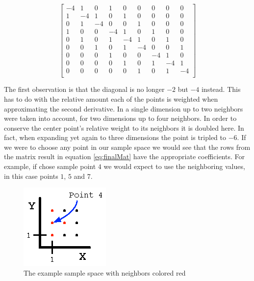 \documentclass[authoryearcitations]{UoYCSproject}
\begin{document}
\begin{equation}
                       \begin{bmatrix}
                                        -4 & 1 & 0 & 1 & 0 & 0 & 0 & 0 & 0 \\
                                        1 & -4 & 1 & 0 & 1 & 0 & 0 & 0 & 0 \\ 
                                        0 & 1 & -4 & 0 & 0 & 1 & 0 & 0 & 0 \\
                                        1 & 0 & 0 & -4 & 1 & 0 & 1 & 0 & 0 \\
                                        0 & 1 & 0 & 1 & -4 & 1 & 0 & 1 & 0 \\
                                        0 & 0 & 1 & 0 & 1 & -4 & 0 & 0 & 1 \\
                                        0 & 0 & 0 & 1 & 0 & 0 & -4 & 1 & 0 \\
                                        0 & 0 & 0 & 0 & 1 & 0 & 1 & -4 & 1 \\
                                        0 & 0 & 0 & 0 & 0 & 1 & 0 & 1 & -4 \\
                                      \end{bmatrix}
\label{eq:finalMat}
\end{equation}

The first observation is that the diagonal is no longer $-2$ but $-4$ instead. This has to do with the relative 
amount each of the points is weighted when approximating the second derivative. In a single dimension up to two
neighbors were taken into account, for two dimensions up to four neighbors. In order to conserve the center point's
relative weight to its neighbors it is doubled here. In fact, when expanding yet again to three dimensions the 
point is tripled to $-6$. 
If we were to choose any point in our sample space we would see that the rows from the matrix result in equation 
\ref{eq:finalMat} have the appropriate coefficients. For example, if chose sample point $4$ we would expect to 
use the neighboring values, in this case points $1$, $5$ and $7$. 

\begin{figure}
\centering
\includegraphics[scale=2.0]{figures/9PointExample.eps}
\caption{The example sample space with neighbors colored red}
\label{9PointExample}
\end{figure}
\end{document}
